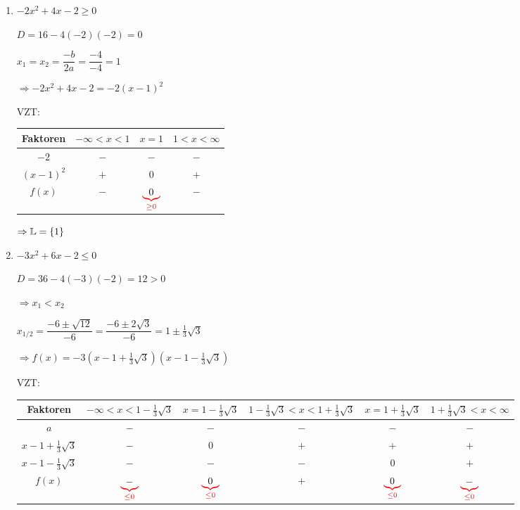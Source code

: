\begin{enumerate}[A)]
	\clearpage
	\Bsps
	\begin{enumerate}[1.]
		\item $-2x^2+4x-2\ge0$
		
		$D=16-4(-2)(-2) = 0$
		
		$x_1=x_2 = \dfrac{-b}{2a}= \dfrac{-4}{-4}= 1$
		
		$\Rightarrow -2x^2+4x-2=-2(x-1)^2$
		
		VZT:\\
		\begin{tabular}{c|c|c|c}
			Faktoren & $-\infty<x<1$ & $x=1$ & $1<x<\infty$\\
			\hline
			$-2$ & $-$ & $-$ & $-$ \\
			$(x-1)^2$ & $+$ & $0$ & $+$ \\
			\hline
			$f(x)$ & $-$ & $\textcolor{red}{\underbrace{\textcolor{black}{0}}_{\ge0}}$ & $-$ \\
		\end{tabular}
		
		$\Rightarrow \mathbb{L}=\{1\}$
		
		\item $-3x^2+6x-2\le0$
		
		$D=36-4(-3)(-2) = 12 > 0$
		
		$\Rightarrow x_1 < x_2$
		
		$x_{1/2} = \dfrac{-6\pm\sqrt{12}}{-6} = \dfrac{-6\pm2\sqrt{3}}{-6} = 1 \pm \frac{1}{3}\sqrt{3}$
		
		$\Rightarrow f(x) = -3(x - 1 + \frac{1}{3}\sqrt{3})(x - 1 - \frac{1}{3}\sqrt{3})$
		
		VZT:\\
		\begin{longtable}{c|c|c|c|c|c}
			Faktoren & \parbox{12ex}{$-\infty<x<1 - \frac{1}{3}\sqrt{3}$} & \parbox{8ex}{$x=1 - \frac{1}{3}\sqrt{3}$} & \parbox{12ex}{$1 - \frac{1}{3}\sqrt{3}<x<1 + \frac{1}{3}\sqrt{3}$} & \parbox{8ex}{$x=1 + \frac{1}{3}\sqrt{3}$} & \parbox{12ex}{$1 + \frac{1}{3}\sqrt{3}<x<\infty$}\\
			\hline
			$a$ & $-$ & $-$ & $-$ & $-$ & $-$ \\
			$x - 1 + \frac{1}{3}\sqrt{3}$ & $-$ & $0$ & $+$ & $+$ & $+$ \\
			$x - 1 - \frac{1}{3}\sqrt{3}$ & $-$ & $-$ & $-$ & $0$ & $+$ \\
			\hline
			$f(x)$ & $\textcolor{red}{\underbrace{\textcolor{black}{-}}_{\le0}}$ & $\textcolor{red}{\underbrace{\textcolor{black}{0}}_{\le0}}$ & $+$ & $\textcolor{red}{\underbrace{\textcolor{black}{0}}_{\le0}}$ & $\textcolor{red}{\underbrace{\textcolor{black}{-}}_{\le0}}$ \\
		\end{longtable}
		

\end{enumerate}
\end{enumerate}
